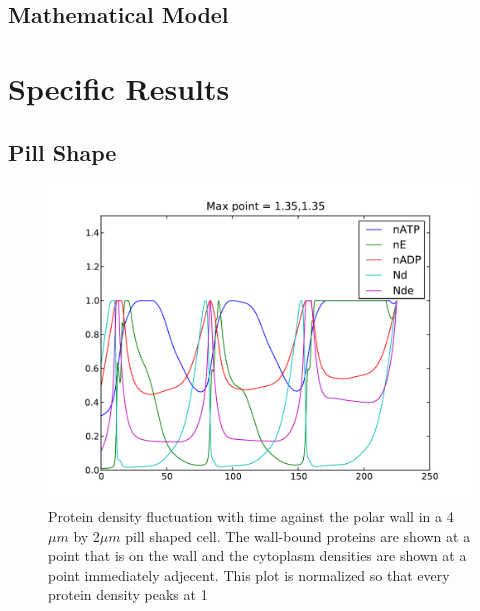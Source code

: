 \documentclass[letterpaper,twocolumn,amsmath,amssymb,pre]{revtex4-1}
\begin{document}
\subsection{Mathematical Model}
\section{Specific Results}
\subsection{Pill Shape}
\begin{figure}
  \includegraphics[width=\columnwidth]{../data/shape-p/plots/frequency_plot_all_norm-p-40-20-0-0-150.pdf}
  \caption{Protein density fluctuation with time against the polar
    wall in a 4$\mu m$ by 2$\mu m$ pill shaped cell.  The wall-bound
    proteins are shown at a point that is on the wall and the
    cytoplasm densities are shown at a point immediately adjecent.
    This plot is normalized so that every protein density peaks at 1}
  \label{frequency-plot-40-20-0-0-150}
\end{figure}
\end{document}
